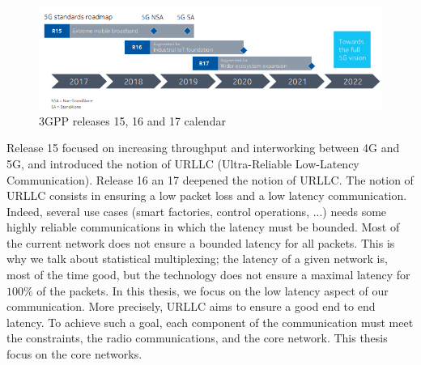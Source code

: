 \documentclass[a4paper,10pt]{article}
\begin{document}
  \begin{figure}[h]
      \begin{center}
      \includegraphics[width=1\textwidth]{release.png}
      \end{center}
      \caption{3GPP releases 15, 16 and 17 calendar}\label{fig:release}
      \end{figure}
  
Release 15 focused on increasing throughput and interworking between 4G and 5G, and introduced the notion of URLLC (Ultra-Reliable Low-Latency Communication). Release 16 an 17 deepened the notion of URLLC. The notion of URLLC consists in ensuring a low packet loss and a low latency communication. Indeed, several use cases (smart factories, control operations, ...) needs some highly reliable communications in which the latency must be bounded. Most of the current network does not ensure a bounded latency for all packets. This is why we talk about statistical multiplexing; the latency of a given network is, most of the time good, but the technology does not ensure a maximal latency for $100\%$ of the packets.  In this thesis, we focus on the low latency aspect of our communication. More precisely, URLLC aims to ensure a good end to end latency. To achieve such a goal, each component of the communication must meet the constraints, the radio communications, and the core network. This thesis focus on the core networks. 
\end{document}
